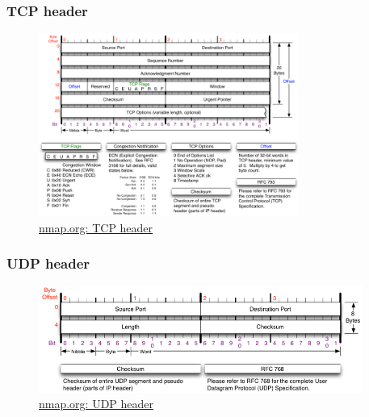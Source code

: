   \begin{frame}
    \frametitle{TCP header}
    \begin{figure}[p]
        \centering
        \includegraphics[height=6cm]{./imgs/tcp-hdr.png}
        \caption{\color{blue}\href{http://nmap.org/book/tcpip-ref.html}{nmap.org: TCP header}}
      \label{fig:tcp-header}
    \end{figure}
  \end{frame}

  \begin{frame}
    \frametitle{UDP header}
    \begin{figure}[p]
        \centering
        \includegraphics[height=3.5cm]{./imgs/udp-hdr.png}
        \caption{\color{blue}\href{http://nmap.org/book/tcpip-ref.html}{nmap.org: UDP header}}
      \label{fig:udp-header}
    \end{figure}
  \end{frame}

